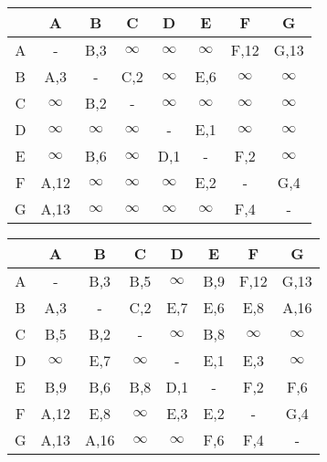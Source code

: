\documentclass{../exercisesheet}
\begin{document}
\begin{exercise}{4}
\begin{subexercise}
\begin{center}
\begin{tabular}{c||c|c|c|c|c|c|c}
 & A & B & C & D & E & F & G \\
\hline
\hline
A & - & B,3 & $\infty$ & $\infty$ & $\infty$ & F,12 & G,13 \\
\hline
B & A,3 & - & C,2 & $\infty$ & E,6 & $\infty$ & $\infty$ \\
\hline
C & $\infty$ & B,2 & - & $\infty$ & $\infty$ & $\infty$ & $\infty$ \\
\hline
D & $\infty$ & $\infty$ & $\infty$ & - & E,1 & $\infty$ & $\infty$ \\
\hline
E & $\infty$ & B,6 & $\infty$ & D,1 & - & F,2 & $\infty$ \\
\hline
F & A,12 & $\infty$ & $\infty$ & $\infty$ & E,2 & - & G,4 \\
\hline
G & A,13 & $\infty$ & $\infty$ & $\infty$ & $\infty$ & F,4 & - \\
\hline
\end{tabular}
\end{center}
\end{subexercise}
\begin{subexercise}
\begin{center}
\begin{tabular}{c||c|c|c|c|c|c|c}
 & A & B & C & D & E & F & G \\
\hline
\hline
A & - & B,3 & B,5 & $\infty$ & B,9 & F,12 & G,13 \\
\hline
B & A,3 & - & C,2 & E,7 & E,6 & E,8 & A,16 \\
\hline
C & B,5 & B,2 & - & $\infty$ & B,8 & $\infty$ & $\infty$ \\
\hline
D & $\infty$ & E,7 & $\infty$ & - & E,1 & E,3 & $\infty$ \\
\hline
E & B,9 & B,6 & B,8 & D,1 & - & F,2 & F,6 \\
\hline
F & A,12 & E,8 & $\infty$ & E,3 & E,2 & - & G,4 \\
\hline
G & A,13 & A,16 & $\infty$ & $\infty$ & F,6 & F,4 & - \\
\hline
\end{tabular}
\end{center}
\end{subexercise}
\begin{subexercise}
\begin{center}
\begin{tabular}{c||c|c|c|c|c|c|c}

\end{tabular}
\end{center}
\end{subexercise}
\end{exercise}
\end{document}
